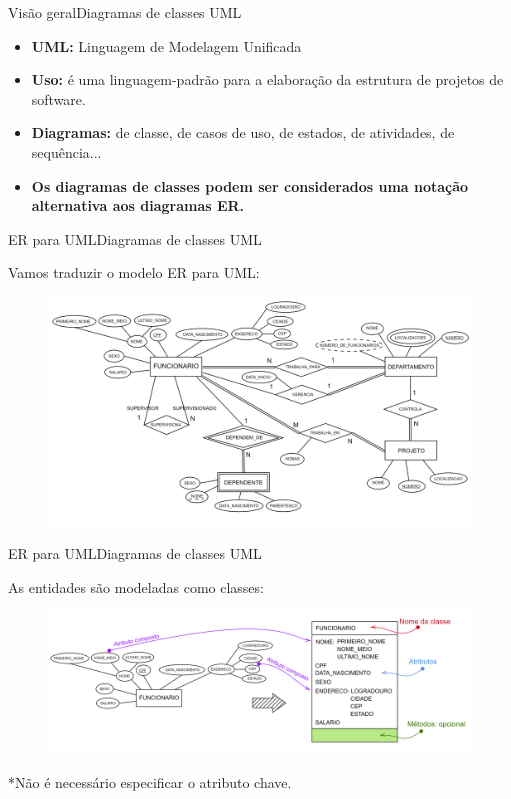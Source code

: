 \documentclass[t]{beamer}
\begin{document}

\begin{ftst}{Visão geral}{Diagramas de classes UML}

\begin{itemize}
    \item \textbf{UML: } Linguagem de Modelagem Unificada
    \item \textbf{Uso: } é uma linguagem-padrão para a elaboração da estrutura de projetos de software.
    \item \textbf{Diagramas: } de classe, de casos de uso, de estados, de atividades, de sequência...
    \item \textbf{Os diagramas de classes podem ser considerados uma notação alternativa aos diagramas ER.}
\end{itemize}
\end{ftst}



\begin{ftst}{ER para UML}{Diagramas de classes UML}

Vamos traduzir o modelo ER para UML:

\begin{figure}
    \centering
    \includegraphics[scale=0.1]{Figuras/03_02.png}

\end{figure}
\end{ftst}


\begin{ftst}{ER para UML}{Diagramas de classes UML}

As entidades são modeladas como classes:
\vone
\begin{figure}
    \centering
    \includegraphics[scale=0.095]{Figuras/UML_1.png}

\end{figure}
\vone
\small
*Não é necessário especificar o atributo chave.
\end{ftst}
\end{document}
